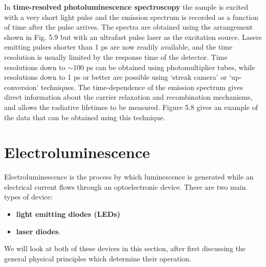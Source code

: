 \documentclass[12pt]{book}
\begin{document}
In \textbf{time-resolved photoluminescence spectroscopy} the sample is excited with a very short light pulse and the emission spectrum is recorded as a function of time after the pulse arrives. The spectra are obtained using the arrangement shown in Fig. 5.9 but with an ultrafast pulse laser as the excitation source. Lasers emitting pulses shorter than 1 ps are now readily available, and the time resolution is usually limited by the response time of the detector. Time resolutions down to $\sim100$ ps can be obtained using photomultiplier tubes, while resolutions down to 1 ps or better are possible using `streak camera' or `up-conversion' techniques. The time-dependence of the emission spectrum gives direct information about the carrier relaxation and recombination mechanisms, and allows the radiative lifetimes to be measured. Figure 5.8 gives an example of the data that can be obtained using this technique.

\section{Electroluminescence}
Electroluminescence is the process by which luminescence is generated while an electrical current flows through an optoelectronic device. There are two main types of device:
\begin{itemize}
  \item \textbf{light emitting diodes (LEDs)}
  \item \textbf{laser diodes}.
\end{itemize}
We will look at both of these devices in this section, after first discussing the general physical principles which determine their operation.
\end{document}
